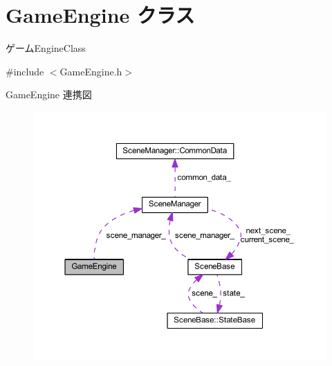 \hypertarget{class_game_engine}{}\section{Game\+Engine クラス}
\label{class_game_engine}


ゲーム\+Engine\+Class  




{\ttfamily \#include $<$Game\+Engine.\+h$>$}



Game\+Engine 連携図\nopagebreak
\begin{figure}[H]
\begin{center}
\leavevmode
\includegraphics[width=350pt]{class_game_engine__coll__graph}
\end{center}
\end{figure}
